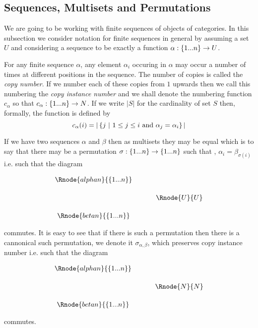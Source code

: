 \documentclass[10pt,a4paper]{scrartcl}
\begin{document}
\subsection{Sequences, Multisets and Permutations}

We are going to be working with finite sequences of objects of categories. In this subsection we 
consider notation for finite sequences in general by assuming a set $U$ and considering a sequence to be exactly a function $\alpha: \left\{1...n\right\} \rightarrow U$.

For any finite sequence $\alpha$, any element $\alpha_i$ occuring in $\alpha$ may occur a number of times at 
different positions in the sequence. The number of copies is called the \textit{copy number}. If we number each of these copies from $1$ upwards then we call this numbering the \textit{copy instance number} and we shall denote
the numbering function  $c_\alpha$ so that $c_\alpha: \left\{1...n\right\} \rightarrow N$. If we write
$|S|$ for the cardinality of set $S$ then, 
formally,
the function is defined by
$$
c_\alpha(i) = |\left\{j \ \middle|\ 1 \leq j \leq i \mbox{ and }\alpha_j=\alpha_i\right\}|
$$

If we have two sequences $\alpha$ and $\beta$ then as multisets they may be equal 
which is to say that there may be a permutation $\sigma: \left\{1...n\right\} \rightarrow \left\{1...n\right\}$ such that 
\foreachi, $\alpha_i = \beta_{\sigma(i)}$
i.e. such that the diagram

\begin{center}
\begin{equation}
\label{permutingcontexts}
\begin{array}{cp{.5cm}c}
\Rnode{alphan}{\set{\n}}&&                  \\ [0.5cm]
                        &&   \Rnode{U}{U}   \\ [0.5cm]
\Rnode{betan}{\set{\n}} &&                           
\end{array}
\end{equation}
\alabel{\alpha}
\blabel{\beta}
\blabel{\sigma}
\end{center}
commutes. It is easy to see that if there is such a permutation then there is a cannonical such
permutation, we denote it $\sigma_{\alpha,\beta}$, which preserves copy instance number i.e. such that the diagram
\begin{center}
\begin{equation}
\label{preservingcopynumber}
\begin{array}{cp{.5cm}c}
\Rnode{alphan}{\set{\n}}  &&              \\ [0.5cm]
												  && \Rnode{N}{N} \\ [0.5cm]
\Rnode{betan}{\set{\n}}   &&            
\end{array}
\end{equation}
\blabel{\sigma_{\alpha,\beta}}
\end{center}				
commutes.
\end{document}
